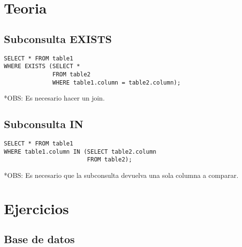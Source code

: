 \documentclass{templateNote}
\begin{document}
\portada
\margenes %

\section{Teoria}
\subsection{Subconsulta EXISTS}
\begin{tcolorbox}
    [colback=gray!5!white,colframe=gray!75!black,fonttitle=\bfseries,title=SQL]
    \begin{sqlcode}
    \end{sqlcode}
    \begin{verbatim}
SELECT * FROM table1
WHERE EXISTS (SELECT *
              FROM table2
              WHERE table1.column = table2.column);
    \end{verbatim}
\end{tcolorbox}
\indent
*OBS: Es necesario hacer un join.
\subsection{Subconsulta IN}
\begin{tcolorbox}
    [colback=gray!5!white,colframe=gray!75!black,fonttitle=\bfseries,title=SQL]
    \begin{sqlcode}
    \end{sqlcode}
    \begin{verbatim}
SELECT * FROM table1
WHERE table1.column IN (SELECT table2.column
                        FROM table2);
    \end{verbatim}
\end{tcolorbox}
\indent
*OBS: Es necesario que la subconsulta devuelva una sola columna a comparar.

\section{Ejercicios}
\subsection{Base de datos}
\end{document}
